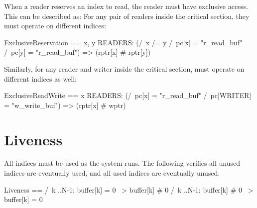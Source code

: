 When a reader reserves an index to read, the reader must have exclusive access. 
This can be described as: For any pair of readers inside the critical section, they
must operate on different indices:\newline

\begin{tla}
ExclusiveReservation == 
    \A x, y \in READERS: 
        (/\ x /= y 
         /\ pc[x] = "r_read_buf" 
         /\ pc[y] = "r_read_buf") 
            => (rptr[x] # rptr[y])
\end{tla}
\begin{tlatex}
%
%
%
%
%
%
\end{tlatex}
\newline

Similarly, for any reader and writer inside the critical section, must operate
on different indices as well:\newline
\begin{tla}
ExclusiveReadWrite == 
    \A x \in READERS: 
        (/\ pc[x] = "r_read_buf" 
         /\ pc[WRITER] = "w_write_buf") 
            => (rptr[x] # wptr)
\end{tla}
\begin{tlatex}
%
%
%
%
%
\end{tlatex}

\section{Liveness}

All indices must be used as the system runs. The following verifies all unused
indices are eventually used, and all used indices are eventually unused:
\newline
\begin{tla}
Liveness ==
    /\ \A k ..N-1:
        buffer[k] = 0 ~> buffer[k] # 0
    /\ \A k ..N-1:
        buffer[k] # 0 ~> buffer[k] = 0
\end{tla}
\begin{tlatex}
%
%
%
%
%
\end{tlatex}
\newline


